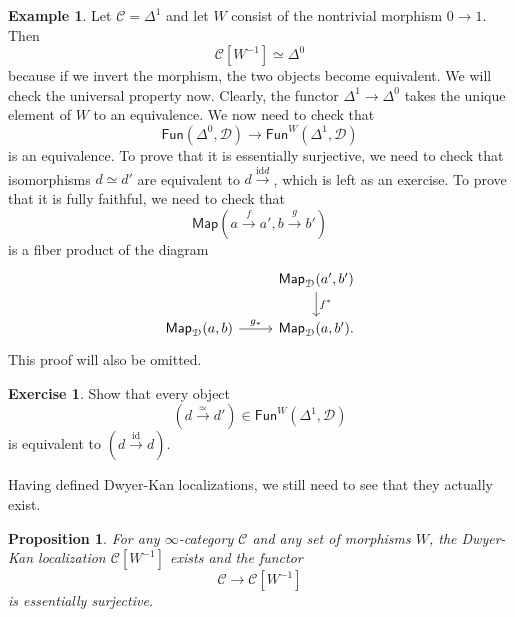 \documentclass[10pt]{amsart}
\newtheorem{prop}[thm]{Proposition}
\theoremstyle{definition}
\newtheorem{exm}[thm]{Example}
\newtheorem{exer}[thm]{Exercise}
\theoremstyle{remark}
\theoremstyle{plain}
\theoremstyle{definition}
\theoremstyle{remark}
\newcommand{\mc}[1]{\mathcal{#1}}
\newcommand{\mr}[1]{\mathrm{#1}}
\newcommand{\ms}[1]{\mathsf{#1}}
\newcommand{\1}{\mathbf{1}}
\newcommand{\2}{\mathbf{2}}
\newcommand{\3}{\mathbf{3}}
\begin{document}
\begin{exm}
    Let $\mc{C} = \Delta^1$ and let $W$ consist of the nontrivial morphism $0 \to 1$. Then 
    \[ \mc{C}[W^{-1}] \simeq \Delta^0 \]
    because if we invert the morphism, the two objects become equivalent. We will check the universal property now. Clearly, the functor $\Delta^1 \to \Delta^0$ takes the unique element of $W$ to an equivalence. We now need to check that
    \[ \ms{Fun}(\Delta^0, \mc{D}) \to \ms{Fun}^W(\Delta^1, \mc{D}) \]
    is an equivalence. To prove that it is essentially surjective, we need to check that isomorphisms $d \simeq d'$ are equivalent to $d \xrightarrow{\mr{id} d}$, which is left as an exercise. To prove that it is fully faithful, we need to check that
    \[ \ms{Map} (a \xrightarrow{f} a', b \xrightarrow{g} b') \]
    is a fiber product of the diagram
    \begin{equation*}
    \begin{tikzcd}
        & \ms{Map}_{\mc{D}}(a', b') \ar{d}{f^*} \\
        \ms{Map}_{\mc{D}}(a, b) \ar{r}{g_*} & \ms{Map}_{\mc{D}}(a, b').
    \end{tikzcd}
    \end{equation*}
    This proof will also be omitted.
\end{exm}

\begin{exer}
    Show that every object
    \[ (d \xrightarrow{\simeq} d') \in \ms{Fun}^W(\Delta^1, \mc{D}) \]
    is equivalent to $(d \xrightarrow{\mr{id}} d)$.
\end{exer}

Having defined Dwyer-Kan localizations, we still need to see that they actually exist.

\begin{prop}
    For any $\infty$-category $\mc{C}$ and any set of morphisms $W$, the Dwyer-Kan localization $\mc{C}[W^{-1}]$ exists and the functor
    \[ \mc{C} \to \mc{C}[W^{-1}] \]
    is essentially surjective.
\end{prop}
\end{document}

